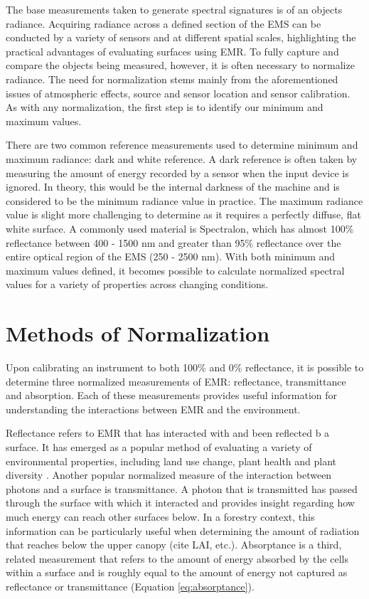 \documentclass[
]{book}
\begin{document}
The base measurements taken to generate spectral signatures is of an
objects radiance. Acquiring radiance across a defined section of the EMS
can be conducted by a variety of sensors and at different spatial
scales, highlighting the practical advantages of evaluating surfaces
using EMR. To fully capture and compare the objects being measured,
however, it is often necessary to normalize radiance. The need for
normalization stems mainly from the aforementioned issues of atmospheric
effects, source and sensor location and sensor calibration. As with any
normalization, the first step is to identify our minimum and maximum
values.

There are two common reference measurements used to determine minimum
and maximum radiance: dark and white reference. A dark reference is
often taken by measuring the amount of energy recorded by a sensor
when the input device is ignored. In theory, this would be the internal
darkness of the machine and is considered to be the minimum radiance
value in practice. The maximum radiance value is slight more challenging
to determine as it requires a perfectly diffuse, flat white surface. A
commonly used material is Spectralon, which has almost 100\% reflectance
between 400 - 1500 nm and greater than 95\% reflectance over the entire
optical region of the EMS (250 - 2500 nm). With both minimum and maximum
values defined, it becomes possible to calculate normalized spectral
values for a variety of properties across changing conditions.

\hypertarget{methods-of-normalization}{%
\section{Methods of Normalization}\label{methods-of-normalization}}

Upon calibrating an instrument to both 100\% and 0\% reflectance, it is
possible to determine three normalized measurements of EMR: reflectance,
transmittance and absorption. Each of these measurements provides useful
information for understanding the interactions between EMR and the
environment.

Reflectance refers to EMR that has interacted with and been reflected b
a surface. It has emerged as a popular method of evaluating a variety of
environmental properties, including land use change, plant health and
plant diversity \citep{asner_spectroscopy_2011}. Another popular normalized measure of the
interaction between photons and a surface is transmittance. A photon
that is transmitted has passed through the surface with which it
interacted and provides insight regarding how much energy can reach
other surfaces below. In a forestry context, this information can be
particularly useful when determining the amount of radiation that
reaches below the upper canopy (cite LAI, etc.). Absorptance is a third,
related measurement that refers to the amount of energy absorbed by
the cells within a surface and is roughly equal to the amount of
energy not captured as reflectance or transmittance (Equation
\eqref{eq:absorptance}).
\end{document}
